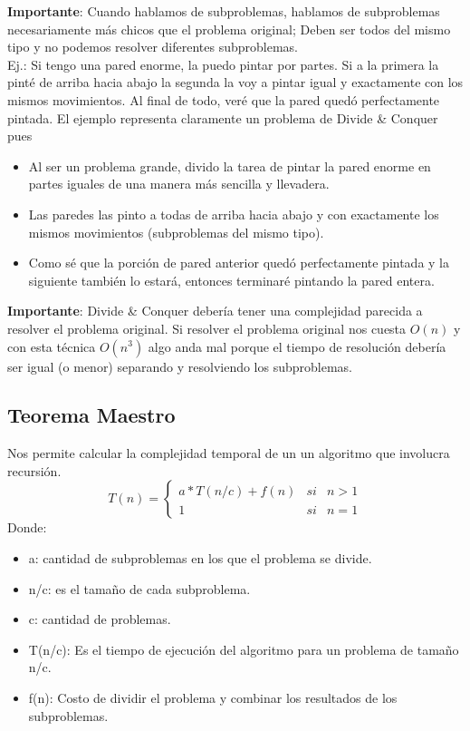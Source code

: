 \documentclass[10pt,a4paper]{article}
\begin{document}
\textbf{Importante}: Cuando hablamos de subproblemas, hablamos de subproblemas necesariamente más chicos que el problema original; Deben ser todos del mismo tipo y no podemos resolver diferentes subproblemas. \\

Ej.: Si tengo una pared enorme, la puedo pintar por partes. Si a la primera la pinté de arriba hacia abajo la segunda la voy a pintar igual y exactamente con los mismos movimientos. Al final de todo, veré que la pared quedó perfectamente pintada.
El ejemplo representa claramente un problema de Divide \& Conquer pues
\begin{itemize}
    \item Al ser un problema grande, divido la tarea de pintar la pared enorme en partes iguales de una manera más sencilla y llevadera.
    \item Las paredes las pinto a todas de arriba hacia abajo y con exactamente los mismos movimientos (subproblemas del mismo tipo).
    \item Como sé que la porción de pared anterior quedó perfectamente pintada y la siguiente también lo estará, entonces terminaré pintando la pared entera.
\end{itemize}

\textbf{Importante}: Divide \& Conquer debería tener una complejidad parecida a resolver el problema original. Si resolver el problema original nos cuesta $O(n)$ y con esta técnica $O(n^{3})$ algo anda mal porque el tiempo de resolución debería ser igual (o menor) separando y resolviendo los subproblemas.
\subsection*{Teorema Maestro}
Nos permite calcular la complejidad temporal de un un algoritmo que involucra recursión.
\[T(n) = \left\{ \begin{array}{lcc} a \ast T(n/c) + f(n) & si & n>1  \\ 1 & si & n=1 \end{array} \right.\]
Donde: 
\begin{itemize}
    \item a: cantidad de subproblemas en los que el problema se divide.
    \item n/c: es el tamaño de cada subproblema.
    \item c: cantidad de problemas.
    \item T(n/c): Es el tiempo de ejecución del algoritmo para un problema de tamaño n/c.
    \item f(n): Costo de dividir el problema y combinar los resultados de los subproblemas.
\end{itemize}
\end{document}
